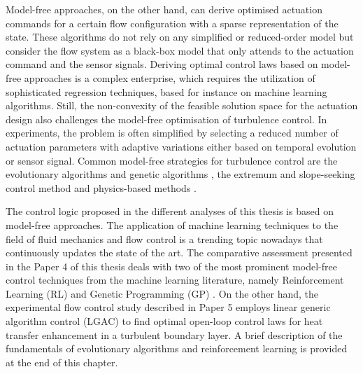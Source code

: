 Model-free approaches, on the other hand, can derive optimised actuation commands for a certain flow configuration with a sparse representation of the state. These algorithms do not rely on any simplified or reduced-order model but consider the flow system as a black-box model that only attends to the actuation command and the sensor signals. Deriving optimal control laws based on model-free approaches is a complex enterprise, which requires the utilization of sophisticated regression techniques, based for instance on machine learning algorithms. Still, the non-convexity of the feasible solution space for the actuation design also challenges the model-free optimisation of turbulence control. In experiments, the problem is often simplified by selecting a reduced number of actuation parameters with adaptive variations either based on temporal evolution or sensor signal. Common model-free strategies for turbulence control are the evolutionary algorithms \citep{Koumoutsakos2001evolcontrol} and genetic algorithms \citep{Benard2016ga}, the extremum and slope-seeking control method \citep{Krstic2000extremumseek, Becker2007extseek, Gelbert2012extseek} and physics-based methods \citep{pastoor2008control,Zhang2004control}. 

The control logic proposed in the different analyses of this thesis is based on model-free approaches. The application of machine learning techniques to the field of fluid mechanics and flow control is a trending topic nowadays that continuously updates the state of the art. The comparative assessment presented in the Paper 4 of this thesis deals with two of the most prominent model-free control techniques from the machine learning literature, namely Reinforcement Learning (RL) \citep{sutton2018reinforcement} and Genetic Programming (GP) \citep{Koza1994gp}. On the other hand, the experimental flow control study described in Paper 5 employs linear generic algorithm control (LGAC) \citep{Benard2016ga} to find optimal open-loop control laws for heat transfer enhancement in a turbulent boundary layer. A brief description of the fundamentals of evolutionary algorithms and reinforcement learning is provided at the end of this chapter.

